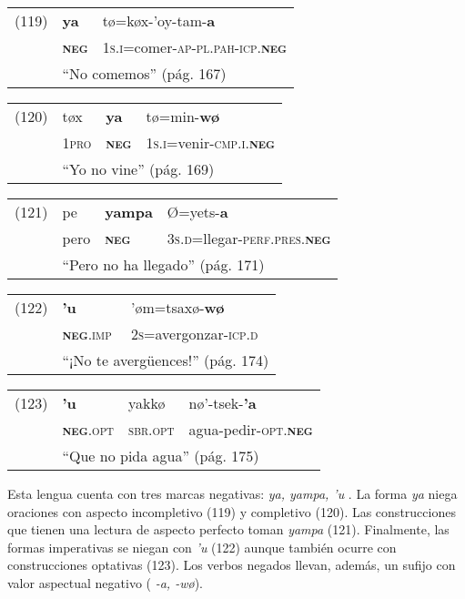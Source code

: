 {\setmainfont{Charis SIL}

\begin{tabular}{lll}
(119) & \textbf{ya} & tø=køx-’oy-tam-\textbf{a }\\
& \textsc{\textbf{neg}} & \textsc{1s.i}=comer-\textsc{ap-pl.pah-icp.\textbf{neg}} \\
& \multicolumn{2}{l}{``No comemos'' (pág. 167)} 
\end{tabular} \vspace{0.5cm}

\begin{tabular}{llll}
(120) & tøx & \textbf{ya} & tø=min-\textbf{wø} \\
& \textsc{1pro} & \textsc{\textbf{neg}} & \textsc{1s.i}=venir-\textsc{cmp.i.\textbf{neg}} \\
& \multicolumn{3}{l}{``Yo no vine'' (pág. 169)}
\end{tabular} \vspace{0.5cm}

\begin{tabular}{llll}
(121) & pe & \textbf{yampa} & Ø=yets-\textbf{a} \\
& pero & \textsc{\textbf{neg}} & \textsc{3s.d}=llegar-\textsc{perf.pres.\textbf{neg}}\\
& \multicolumn{3}{l}{``Pero no ha llegado'' (pág. 171)}
\end{tabular} \vspace{0.5cm}

\begin{tabular}{lll}
(122) & \textbf{’u} & ’øm=tsaxø-\textbf{wø} \\
& \textsc{\textbf{neg}.imp} & \textsc{2s}=avergonzar-\textsc{icp.d} \\
& \multicolumn{2}{l}{``¡No te avergüences!'' (pág. 174)}
\end{tabular} \vspace{0.5cm}

\begin{tabular}{llll}
(123) & \textbf{’u} & yakkø & nø’-tsek-\textbf{’a} \\
& \textsc{\textbf{neg}.opt} & \textsc{sbr.opt} & agua-pedir-\textsc{opt.\textbf{neg}} \\
& \multicolumn{3}{l}{``Que no pida agua'' (pág. 175)}
\end{tabular} \vspace{0.5cm}

}

Esta lengua cuenta con tres marcas negativas: {\setmainfont{Charis SIL} \textit{ya, yampa, 'u}} \textcolor{MidnightBlue}{\citep{zoque}}. La forma {\setmainfont{Charis SIL} \textit{ya}} niega oraciones con aspecto incompletivo (119) y completivo (120). Las construcciones que tienen una lectura de aspecto perfecto toman {\setmainfont{Charis SIL} \textit{yampa}} (121). Finalmente, las formas imperativas se niegan con {\setmainfont{Charis SIL} \textit{'u}} (122) aunque también ocurre con construcciones optativas (123). Los verbos negados llevan, además, un sufijo con valor aspectual negativo ({\setmainfont{Charis SIL} \textit{-a, -wø}}).